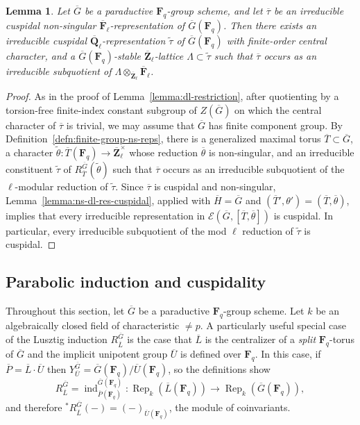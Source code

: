 \documentclass[reqno]{amsart}
\numberwithin{equation}{subsection}
\newcommand{\F}{\mathbf{F}}
\newcommand{\wt}[1]{\widetilde{#1}}
\newcommand{\Q}{\mathbf{Q}}
\newcommand{\Z}{\mathbf{Z}}
\newcommand{\ol}[1]{\overline{#1}}
\newcommand{\co}{\colon}
\newcommand\cE{\mathcal{E}}
\DeclareMathOperator{\Rep}{Rep}
\DeclareMathOperator{\ind}{ind}
\newtheorem{lemma}[thm]{Lemma}
\theoremstyle{remark}
\numberwithin{equation}{subsection}
\numberwithin{figure}{subsection}
\begin{document}
\begin{lemma}\label{lemma:ns-cuspidal-lift}
Let $\ol G$ be a paraductive $\F_q$-group scheme, and let $\ol\tau$ be an irreducible cuspidal non-singular $\ol\F_\ell$-representation of $\ol G(\F_q)$. Then there exists an irreducible cuspidal $\ol\Q_\ell$-representation $\wt\tau$ of $\ol G(\F_q)$ with finite-order central character, and a $\ol G(\F_q)$-stable $\ol\Z_\ell$-lattice $\Lambda \subset \wt\tau$ such that $\ol\tau$ occurs as an irreducible subquotient of $\Lambda \otimes_{\ol\Z_\ell}\ol\F_\ell$.
\end{lemma}

\begin{proof}
As in the proof of Lemma~\ref{lemma:dl-restriction}, after quotienting by a torsion-free finite-index constant subgroup of $Z(\ol G)$ on which the central character of $\ol\tau$ is trivial, we may assume that $\ol G$ has finite component group. By Definition~\ref{defn:finite-group-ns-reps}, there is a generalized maximal torus $\ol T \subset \ol G$, a character $\wt\theta\colon \ol T(\F_q)\to \ol\Z_\ell^\times$ whose reduction $\ol\theta$ is non-singular, and an irreducible constituent $\wt\tau$ of $R_{\ol T}^{\ol G}(\wt\theta)$ such that $\ol\tau$ occurs as an irreducible subquotient of the $\ell$-modular reduction of $\wt\tau$. Since $\ol\tau$ is cuspidal and non-singular, Lemma~\ref{lemma:ns-dl-res-cuspidal}, applied with $\ol H=\ol G$ and $(\ol T',\theta')=(\ol T,\ol\theta)$, implies that every irreducible representation in $\cE(\ol G,[\ol T,\ol\theta])$ is cuspidal. In particular, every irreducible subquotient of the mod $\ell$ reduction of $\wt\tau$ is cuspidal.
\end{proof}













\subsection{Parabolic induction and cuspidality}\label{sss:cusp}

Throughout this section, let $\ol G$ be a paraductive $\F_q$-group scheme. Let $k$ be an algebraically closed field of characteristic $\neq p$. A particularly useful special case of the Lusztig induction $R_{\ol L}^{\ol G}$ is the case that $\ol L$ is the centralizer of a \emph{split} $\F_q$-torus of $\ol G$ and the implicit unipotent group $\ol U$ is defined over $\F_q$. In this case, if $\ol P = \ol L \cdot \ol U$ then $Y_{\ol U}^{\ol G} = \ol G(\F_q)/\ol U(\F_q)$, so the definitions show
\[
    R_{\ol L}^{\ol G} = \ind_{\ol P(\F_q)}^{\ol G(\F_q)}\co \Rep_k(\ol L(\F_q)) \to \Rep_k(\ol G(\F_q)),
\]
and therefore $^*R^{\ol G}_{\ol L}(-) = (-)_{\ol U(\F_q)}$, the module of coinvariants.
\end{document}
